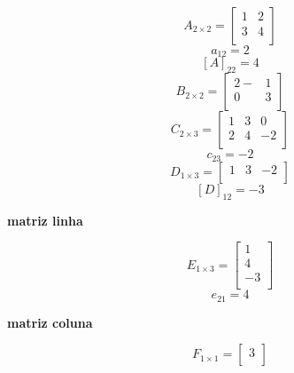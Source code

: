 \documentclass{article}
\begin{document}
\begin{equation*}
    A_{2 \times 2} = 
    \begin{bmatrix}
    1 & 2 \\
    3 & 4 \\
    \end{bmatrix}
\end{equation*}
$$ a_{12} = 2$$ $$ [A]_{22} = 4$$
\newline
\begin{equation*}
    B_{2 \times 2} = 
    \begin{bmatrix}
    2- & 1 \\
    0 & 3 \\
    \end{bmatrix}
\end{equation*}
\newline
\begin{equation*}
    C_{2\times3} = 
    \begin{bmatrix}
    1 & 3 & 0 \\
    2 & 4 & -2 \\
    \end{bmatrix}
\end{equation*}
$$c_{23} = -2 $$
\newline
\begin{equation*}
D_{1 \times 3} = 
    \begin{bmatrix}
    1 & 3 & -2 \\
    \end{bmatrix}
\end{equation*}
$$[D]_{12} = -3 $$
\begin{center}
    \textbf{matriz linha} 
\end{center}


\begin{equation*}
E_{1 \times 3} = 
    \begin{bmatrix}
    1 \\
    4 \\
    -3 \\
    \end{bmatrix}
\end{equation*}
$$ e_{21} = 4$$
\begin{center}
    \textbf{matriz coluna} 
\end{center}

\begin{equation*}
    F_{1 \times 1} = 
        \begin{bmatrix}
        3 \\
        \end{bmatrix}
\end{equation*}
\newline
\end{document}
